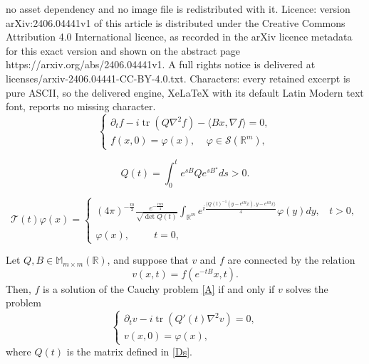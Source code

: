 \documentclass[10pt,a4paper]{amsart}
\def \R {\mathbb{R}}
\newcommand{\Rm}{\mathbb R^m}
\newcommand{\da}{\rangle}
\newcommand{\p}{\partial}
\newcommand{\sa}{\langle}
\newcommand{\vf}{\varphi}
\begin{document}
no asset dependency and no image file is redistributed with it. Licence: version arXiv:2406.04441v1 of this article is distributed under the Creative Commons Attribution 4.0 International licence, as recorded in the arXiv licence metadata for this exact version and shown on the abstract page https://arxiv.org/abs/2406.04441v1. A full rights notice is delivered at licenses/arxiv-2406.04441-CC-BY-4.0.txt. Characters: every retained excerpt is pure ASCII, so the delivered engine, XeLaTeX with its default Latin Modern text font, reports no missing character.
\begin{equation}\label{A}
\begin{cases}
\p_t f- i \operatorname{tr}(Q \nabla^2 f) -  \langle B x,\nabla f\rangle  = 0,
\\
f(x,0) = \vf(x),\ \ \ \ \ \vf\in \mathscr S(\Rm),
\end{cases}
\end{equation} 

\begin{equation}\label{Ds}
Q(t) = \int_0^t e^{sB}Q e^{sB^\star} ds > 0.
\end{equation}

\begin{equation}\label{f}
\mathcal T(t) \vf(x)  = \begin{cases}
(4\pi
)^{-\frac{m}{2}} \frac{e^{-\frac{i \pi m}4}}{\sqrt{\det Q(t)}}   \int_{\Rm} e^{i \frac{\sa Q(t)^{-1}(y-e^{tB}x),y-e^{tB}x\da}{4}} \vf(y) dy,\ \ \ \ t>0,
\\
\\
\vf(x),\ \ \ \ \ \ \ \ \ \ \  t = 0,
\end{cases}
\end{equation}

\begin{lemma}\label{L:drift}
Let $Q, B\in \mathbb M_{m\times m}(\R)$, and suppose that $v$ and $f$ are connected by the relation
\begin{equation}\label{drift}
v(x,t) = f(e^{- t B} x,t).
\end{equation}
Then, $f$ is a solution of the Cauchy problem \eqref{A} if and only if $v$ solves the problem
\begin{equation}\label{Abis}
\begin{cases}
\p_t v - i \operatorname{tr}(Q'(t) \nabla^2 v) = 0,
\\
v(x,0) = \vf(x),
\end{cases}
\end{equation} 
where $Q(t)$ is the matrix defined in \eqref{Ds}.
\end{lemma}
\end{document}
